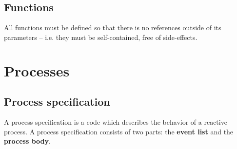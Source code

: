 \documentclass{pamsbook}
\begin{document}
\subsection{Functions}
All functions must be defined so that there is no references outside
of its parameters -- i.e. they must be self-contained, free of side-effects.


\section{Processes}




\subsection{Process specification}
A process specification is a code which describes the behavior of a reactive
process. A process specification consists of two parts: the
{\bf event list\/} and the {\bf process body\/}.  
\end{document}

